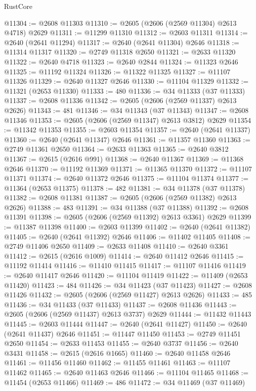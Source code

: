 \begin{lexlean}{RustCore}
\begin{coremodule}
@11304 := @2608 @11303
@11310 := @2605 (@2606 (@2569 @11304) @2613 @4718) @2629
@11311 := @11299 @11310
@11312 := @2603 @11311
@11314 := @2640 (@2641 @11294)
@11317 := @2640 (@2641 @11304) @2646
@11318 := @11314 @11317
@11320 := @2749 @11318 @2650
@11321 := @2633 @11320
@11322 := @2640 @4718
@11323 := @2640 @2844
@11324 := @11323 @2646
@11325 := @11192 @11324
@11326 := @11322 @11325
@11327 := @11107 @11326
@11329 := @2640 @11327 @2646
@11330 := @11104 @11329
@11332 := @11321 (@2653 @11330)
@11333 := 480
@11336 := @34 @11333 (@37 @11333)
@11337 := @2608 @11336
@11342 := @2605 (@2606 (@2569 @11337) @2613 @2626)
@11343 := 481
@11346 := @34 @11343 (@37 @11343)
@11347 := @2608 @11346
@11353 := @2605 (@2606 (@2569 @11347) @2613 @3812) @2629
@11354 := @11342 @11353
@11355 := @2603 @11354
@11357 := @2640 (@2641 @11337)
@11360 := @2640 (@2641 @11347) @2646
@11361 := @11357 @11360
@11363 := @2749 @11361 @2650
@11364 := @2633 @11363
@11365 := @2640 @3812
@11367 := @2615 (@2616 @991)
@11368 := @2640 @11367
@11369 := @11368 @2646
@11370 := @11192 @11369
@11371 := @11365 @11370
@11372 := @11107 @11371
@11374 := @2640 @11372 @2646
@11375 := @11104 @11374
@11377 := @11364 (@2653 @11375)
@11378 := 482
@11381 := @34 @11378 (@37 @11378)
@11382 := @2608 @11381
@11387 := @2605 (@2606 (@2569 @11382) @2613 @2626)
@11388 := 483
@11391 := @34 @11388 (@37 @11388)
@11392 := @2608 @11391
@11398 := @2605 (@2606 (@2569 @11392) @2613 @3361) @2629
@11399 := @11387 @11398
@11400 := @2603 @11399
@11402 := @2640 (@2641 @11382)
@11405 := @2640 (@2641 @11392) @2646
@11406 := @11402 @11405
@11408 := @2749 @11406 @2650
@11409 := @2633 @11408
@11410 := @2640 @3361
@11412 := @2615 (@2616 @1009)
@11414 := @2640 @11412 @2646
@11415 := @11192 @11414
@11416 := @11410 @11415
@11417 := @11107 @11416
@11419 := @2640 @11417 @2646
@11420 := @11104 @11419
@11422 := @11409 (@2653 @11420)
@11423 := 484
@11426 := @34 @11423 (@37 @11423)
@11427 := @2608 @11426
@11432 := @2605 (@2606 (@2569 @11427) @2613 @2626)
@11433 := 485
@11436 := @34 @11433 (@37 @11433)
@11437 := @2608 @11436
@11443 := @2605 (@2606 (@2569 @11437) @2613 @3737) @2629
@11444 := @11432 @11443
@11445 := @2603 @11444
@11447 := @2640 (@2641 @11427)
@11450 := @2640 (@2641 @11437) @2646
@11451 := @11447 @11450
@11453 := @2749 @11451 @2650
@11454 := @2633 @11453
@11455 := @2640 @3737
@11456 := @2640 @3431
@11458 := @2615 (@2616 @1665)
@11460 := @2640 @11458 @2646
@11461 := @11456 @11460
@11462 := @11455 @11461
@11463 := @11107 @11462
@11465 := @2640 @11463 @2646
@11466 := @11104 @11465
@11468 := @11454 (@2653 @11466)
@11469 := 486
@11472 := @34 @11469 (@37 @11469)

\end{coremodule}
\end{lexlean}
